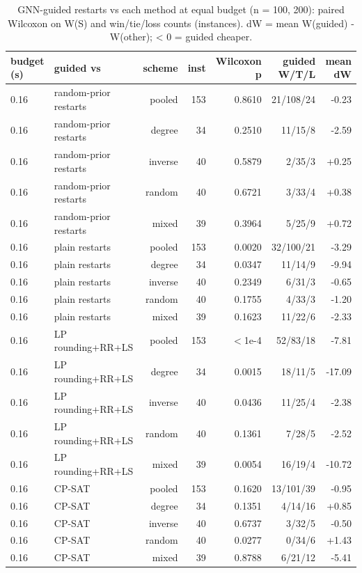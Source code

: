 \begin{table}[t]
\centering
\caption{GNN-guided restarts vs each method at equal budget (n = 100, 200): paired Wilcoxon on W(S) and win/tie/loss counts (instances). dW = mean W(guided) - W(other); < 0 = guided cheaper.}
\label{tab:rev2_step1_tests}
\scriptsize
\begin{tabular}{llrrrrr}
\toprule
budget (s) & guided vs & scheme & inst & Wilcoxon p & guided W/T/L & mean dW \\
\midrule
0.16 & random-prior restarts & pooled & 153 & 0.8610 & 21/108/24 & -0.23 \\
0.16 & random-prior restarts & degree & 34 & 0.2510 & 11/15/8 & -2.59 \\
0.16 & random-prior restarts & inverse & 40 & 0.5879 & 2/35/3 & +0.25 \\
0.16 & random-prior restarts & random & 40 & 0.6721 & 3/33/4 & +0.38 \\
0.16 & random-prior restarts & mixed & 39 & 0.3964 & 5/25/9 & +0.72 \\
0.16 & plain restarts & pooled & 153 & 0.0020 & 32/100/21 & -3.29 \\
0.16 & plain restarts & degree & 34 & 0.0347 & 11/14/9 & -9.94 \\
0.16 & plain restarts & inverse & 40 & 0.2349 & 6/31/3 & -0.65 \\
0.16 & plain restarts & random & 40 & 0.1755 & 4/33/3 & -1.20 \\
0.16 & plain restarts & mixed & 39 & 0.1623 & 11/22/6 & -2.33 \\
0.16 & LP rounding+RR+LS & pooled & 153 & $<$1e-4 & 52/83/18 & -7.81 \\
0.16 & LP rounding+RR+LS & degree & 34 & 0.0015 & 18/11/5 & -17.09 \\
0.16 & LP rounding+RR+LS & inverse & 40 & 0.0436 & 11/25/4 & -2.38 \\
0.16 & LP rounding+RR+LS & random & 40 & 0.1361 & 7/28/5 & -2.52 \\
0.16 & LP rounding+RR+LS & mixed & 39 & 0.0054 & 16/19/4 & -10.72 \\
0.16 & CP-SAT & pooled & 153 & 0.1620 & 13/101/39 & -0.95 \\
0.16 & CP-SAT & degree & 34 & 0.1351 & 4/14/16 & +0.85 \\
0.16 & CP-SAT & inverse & 40 & 0.6737 & 3/32/5 & -0.50 \\
0.16 & CP-SAT & random & 40 & 0.0277 & 0/34/6 & +1.43 \\
0.16 & CP-SAT & mixed & 39 & 0.8788 & 6/21/12 & -5.41 \\

\end{tabular}
\end{table}
